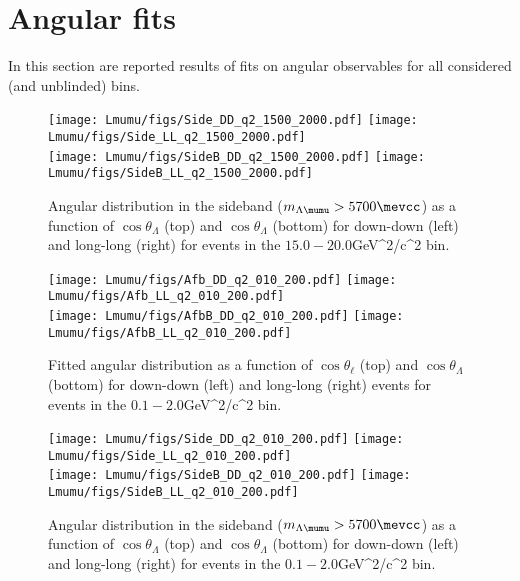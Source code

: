 \section{Angular fits}
\label{app:AngRes}

In this section are reported results of fits on angular observables for all considered (and unblinded) \qsq bins.


\begin{figure}[!htb]
\centering
\texttt{[image: Lmumu/figs/Side\_DD\_q2\_1500\_2000.pdf]}
\texttt{[image: Lmumu/figs/Side\_LL\_q2\_1500\_2000.pdf]} \\
\texttt{[image: Lmumu/figs/SideB\_DD\_q2\_1500\_2000.pdf]}
\texttt{[image: Lmumu/figs/SideB\_LL\_q2\_1500\_2000.pdf]}
\caption{Angular distribution in the sideband ($m_{\Lambda\mumu} > 5700 \mevcc$) as a function of $\cos\theta_\Lambda$ (top) and $\cos\theta_\Lambda$ (bottom) for down-down (left) and long-long (right) for events in the $15.0-20.0$GeV^2/c^2$$ \qsq bin.  }
\end{figure}





\begin{figure}[!htb]
\centering
\texttt{[image: Lmumu/figs/Afb\_DD\_q2\_010\_200.pdf]}
\texttt{[image: Lmumu/figs/Afb\_LL\_q2\_010\_200.pdf]} \\
\texttt{[image: Lmumu/figs/AfbB\_DD\_q2\_010\_200.pdf]}
\texttt{[image: Lmumu/figs/AfbB\_LL\_q2\_010\_200.pdf]}
\caption{Fitted angular distribution as a function of $\cos\theta_\ell$ (top) and $\cos\theta_\Lambda$ (bottom) for down-down (left) and long-long (right) events for events in the $0.1-2.0$GeV^2/c^2$$ \qsq bin.  }
\end{figure}


\begin{figure}[!htb]
\centering
\texttt{[image: Lmumu/figs/Side\_DD\_q2\_010\_200.pdf]}
\texttt{[image: Lmumu/figs/Side\_LL\_q2\_010\_200.pdf]} \\
\texttt{[image: Lmumu/figs/SideB\_DD\_q2\_010\_200.pdf]}
\texttt{[image: Lmumu/figs/SideB\_LL\_q2\_010\_200.pdf]}
\caption{Angular distribution in the sideband ($m_{\Lambda\mumu} > 5700 \mevcc$) as a function of $\cos\theta_\Lambda$ (top) and $\cos\theta_\Lambda$ (bottom) for down-down (left) and long-long (right) for events in the $0.1-2.0$GeV^2/c^2$$ \qsq bin.  }
\end{figure}



